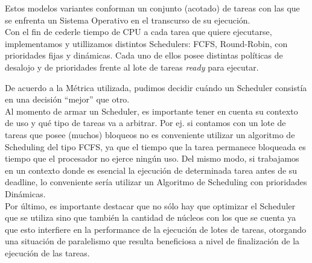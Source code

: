 \documentclass[a4paper]{article}
\begin{document}
Estos modelos variantes conforman un conjunto (acotado) de tareas con las que se enfrenta un Sistema Operativo en el transcurso de su ejecuci\'on.\\

Con el fin de cederle tiempo de CPU a cada tarea que quiere ejecutarse, implementamos y utillizamos distintos Schedulers: FCFS, Round-Robin, con prioridades fijas y din\'amicas. Cada uno de ellos posee distintas pol\'iticas de desalojo y de prioridades frente al lote de tareas \emph{ready} para ejecutar.

De acuerdo a la M\'etrica utilizada, pudimos decidir cu\'ando un Scheduler consist\'ia en una decisi\'on ``mejor'' que otro.\\

Al momento de armar un Scheduler, es importante tener en cuenta su contexto de uso y qu\'e tipo de tareas va a arbitrar. Por ej. si contamos con un lote de tareas que posee (muchos) bloqueos no es conveniente utilizar un algoritmo de Scheduling del tipo FCFS, ya que el tiempo que la tarea permanece bloqueada es tiempo que el procesador no ejerce ning\'un uso. Del mismo modo, si trabajamos en un contexto donde es esencial la ejecuci\'on de determinada tarea antes de su deadline, lo conveniente ser\'ia utilizar un Algoritmo de Scheduling con prioridades Din\'amicas.\\


Por \'ultimo, es importante destacar que no s\'olo hay que optimizar el Scheduler que se utiliza sino que tambi\'en la cantidad de n\'ucleos con los que se cuenta ya que esto interfiere en la performance de la ejecuci\'on de lotes de tareas, otorgando una situaci\'on de paralelismo que resulta beneficiosa a nivel de finalizaci\'on de la ejecuci\'on de las tareas. 
\end{document}
